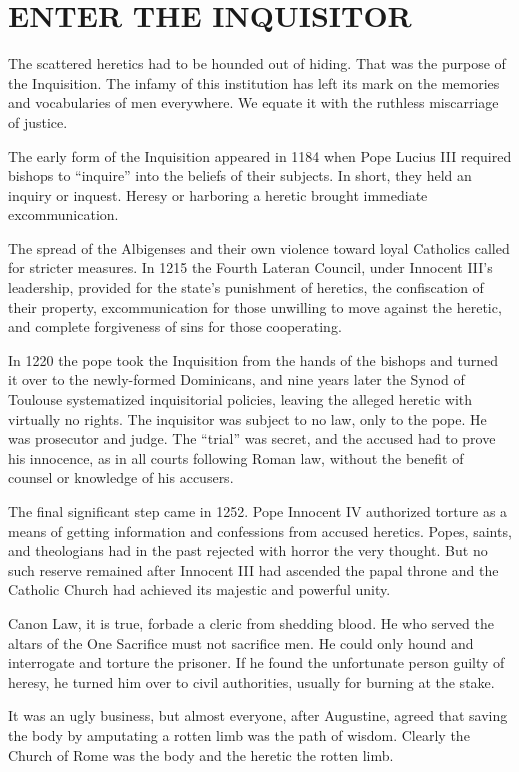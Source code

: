 \section{ENTER THE INQUISITOR}

The scattered heretics had to be hounded out of hiding. That was the purpose of the Inquisition. The
infamy of this institution has left its mark on the memories and vocabularies of men everywhere. We
equate it with the ruthless miscarriage of justice.

The early form of the Inquisition appeared in 1184 when Pope Lucius III required bishops to
“inquire” into the beliefs of their subjects. In short, they held an inquiry or inquest. Heresy or
harboring a heretic brought immediate excommunication.

The spread of the Albigenses and their own violence toward loyal Catholics called for stricter
measures. In 1215 the Fourth Lateran Council, under Innocent III’s leadership, provided for the
state’s punishment of heretics, the confiscation of their property, excommunication for those
unwilling to move against the heretic, and complete forgiveness of sins for those cooperating.

In 1220 the pope took the Inquisition from the hands of the bishops and turned it over to the
newly-formed Dominicans, and nine years later the Synod of Toulouse systematized inquisitorial
policies, leaving the alleged heretic with virtually no rights. The inquisitor was subject to no
law, only to the pope. He was prosecutor and judge. The “trial” was secret, and the accused had to
prove his innocence, as in all courts following Roman law, without the benefit of counsel or
knowledge of his accusers.

The final significant step came in 1252. Pope Innocent IV authorized torture as a means of getting
information and confessions from accused heretics. Popes, saints, and theologians had in the past
rejected with horror the very thought. But no such reserve remained after Innocent III had ascended
the papal throne and the Catholic Church had achieved its majestic and powerful unity.

Canon Law, it is true, forbade a cleric from shedding blood. He who served the altars of the One
Sacrifice must not sacrifice men. He could only hound and interrogate and torture the prisoner. If
he found the unfortunate person guilty of heresy, he turned him over to civil authorities, usually
for burning at the stake.

It was an ugly business, but almost everyone, after Augustine, agreed that saving the body by
amputating a rotten limb was the path of wisdom. Clearly the Church of Rome was the body and the
heretic the rotten limb.

